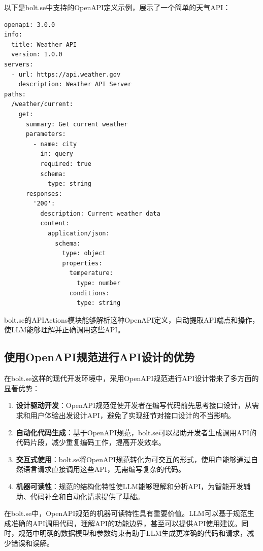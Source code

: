 以下是bolt.se中支持的OpenAPI定义示例，展示了一个简单的天气API：

\begin{verbatim}
openapi: 3.0.0
info:
  title: Weather API
  version: 1.0.0
servers:
  - url: https://api.weather.gov
    description: Weather API Server
paths:
  /weather/current:
    get:
      summary: Get current weather
      parameters:
        - name: city
          in: query
          required: true
          schema:
            type: string
      responses:
        '200':
          description: Current weather data
          content:
            application/json:
              schema:
                type: object
                properties:
                  temperature:
                    type: number
                  conditions:
                    type: string
\end{verbatim}

bolt.se的APIActions模块能够解析这种OpenAPI定义，自动提取API端点和操作，使LLM能够理解并正确调用这些API。

\subsection{使用OpenAPI规范进行API设计的优势}
在bolt.se这样的现代开发环境中，采用OpenAPI规范进行API设计带来了多方面的显著优势：

\begin{enumerate}
  \item \textbf{设计驱动开发}：OpenAPI规范促使开发者在编写代码前先思考接口设计，从需求和用户体验出发设计API，避免了实现细节对接口设计的不当影响。
  
  \item \textbf{自动化代码生成}：基于OpenAPI规范，bolt.se可以帮助开发者生成调用API的代码片段，减少重复编码工作，提高开发效率。
  
  \item \textbf{交互式使用}：bolt.se将OpenAPI规范转化为可交互的形式，使用户能够通过自然语言请求直接调用这些API，无需编写复杂的代码。
    
  \item \textbf{机器可读性}：规范的结构化特性使LLM能够理解和分析API，为智能开发辅助、代码补全和自动化请求提供了基础。
\end{enumerate}

在bolt.se中，OpenAPI规范的机器可读特性具有重要价值。LLM可以基于规范生成准确的API调用代码，理解API的功能边界，甚至可以提供API使用建议。同时，规范中明确的数据模型和参数约束有助于LLM生成更准确的代码和请求，减少错误和误解。

